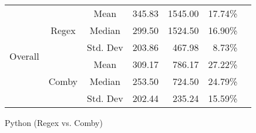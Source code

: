 \documentclass[sigconf,review, anonymous]{acmart}
\begin{document}
{\begin{table}[hbtp]
{\begin{tabular}{|c|c|c|r|r|r|c|}
\multirow{6}{*}{Overall} & \multirow{3}{*}{Regex} & Mean & 345.83 & 1545.00  & 17.74\%& \\\cline{3-6}
    &   &  Median & 299.50 & 1524.50 & 16.90\%  & \\\cline{3-6}
    &   &  Std. Dev & 203.86 & 467.98 & 8.73\%  & \\\cline{2-6}

 & \multirow{3}{*}{Comby} & Mean & 309.17 & 786.17 & 27.22\% & \\\cline{3-6}
    &   &  Median & 253.50 & 724.50 & 24.79\%  & \\\cline{3-6}
    &   &  Std. Dev & 202.44 & 235.24  & 15.59\%  & \\\hline


\end{tabular}

}
\end{table}


\begin{table}[hbtp]
\centering
\caption{Python (Regex vs. Comby)}
\label{tab:table_python1}
\resizebox{\columnwidth}{!}{%

}
\end{table}}
\end{document}
